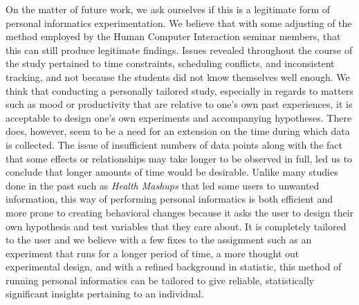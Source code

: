 On the matter of future work, we ask ourselves if this is a legitimate form of personal informatics experimentation. We believe that with some adjusting of the method employed by the Human Computer Interaction seminar members, that this can still produce legitimate findings.  Issues revealed throughout the course of the study pertained to time constraints, scheduling conflicts, and inconsistent tracking, and not because the students did not know themselves well enough.  We think that conducting a personally tailored study, especially in regards to matters such as mood or productivity that are relative to one's own past experiences, it is acceptable to design one's own experiments and accompanying hypotheses.  There does, however, seem to be a need for an extension on the time during which data is collected.  The issue of insufficient numbers of data points along with the fact that some effects or relationships may take longer to be observed in full, led us to conclude that longer amounts of time would be desirable. Unlike many studies done in the past such as \textit{Health Mashups} that led some users to unwanted information, this way of performing personal informatics is both efficient and more prone to creating behavioral changes because it asks the user to design their own hypothesis and test variables that they care about. It is completely tailored to the user and we believe with a few fixes to the assignment such as an experiment that runs for a longer period of time, a more thought out experimental design, and with a refined background in statistic, this method of running personal informatics can be tailored to give reliable, statistically significant insights pertaining to an individual.
